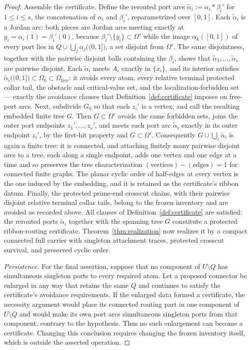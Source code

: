 \documentclass[11pt,reqno]{amsart}
\theoremstyle{definition}
\theoremstyle{remark}
\newcommand{\Omfree}{\Omega_{\mathrm{free}}}
\begin{document}
\begin{proof}
Assemble the certificate. Define the rerouted port arcs
$\tilde\alpha_i:=\alpha_i*\beta_i'$ for $1\le i\le s$, the concatenation of $\alpha_i$
and $\beta_i'$, reparametrized over $[0,1]$. Each $\tilde\alpha_i$ is a Jordan arc: both
pieces are Jordan arcs meeting exactly at $y_i=\alpha_i(1)=\beta_i'(0)$, because
$\beta_i'\setminus\{y_i\}\subset\Omega'$ while the image
$\alpha_k([0,1])$ of every port lies in
$Q\cup\bigcup_j\alpha_j\bigl((0,1]\bigr)$, a set disjoint from $\Omega'$. The same
disjointness, together with the pairwise disjoint balls containing the $\beta_i$, shows
that $\tilde\alpha_1,\dots,\tilde\alpha_s$ are pairwise disjoint. Each $\tilde\alpha_i$
meets $A_i$ exactly in $\{x_i\}$, and its interior satisfies
$\tilde\alpha_i\bigl((0,1]\bigr)\subset\Omega_0\subset\Omfree$: it avoids every atom,
every relative terminal protected collar tail, the obstacle and critical-value set, and the
localization-forbidden set --- exactly the avoidance clauses that
Definition~\ref{def:certificate} imposes on free-port arcs. Next, subdivide $G_0$ so
that each $z_i'$ is a vertex, and call the resulting embedded finite tree $G$. Then
$G\subset\Omega'$ avoids the same forbidden sets, joins the outer port endpoints
$z_1',\dots,z_s'$, and meets each port arc $\tilde\alpha_i$ exactly in its outer
endpoint $z_i'$, by the first-hit property and $G\subset\Omega'$. Consequently
$G\cup\bigcup_i\tilde\alpha_i$ is again a finite tree: it is connected, and attaching
finitely many pairwise disjoint arcs to a tree, each along a single endpoint, adds one
vertex and one edge at a time and so preserves the tree characterization
$(\text{vertices})-(\text{edges})=1$ for connected finite graphs. The planar cyclic
order of half-edges at every vertex is the one induced by the embedding, and it is
retained as the certificate's ribbon datum. Finally, the protected prime-end crosscut
chains, with their pairwise disjoint relative terminal collar tails, belong to the frozen
inventory and are avoided as recorded above. All clauses of
Definition~\ref{def:certificate} are satisfied: the rerouted ports $\tilde\alpha_i$
together with the spanning tree $G$ constitute a protected ribbon-routing certificate.
Theorem~\ref{thm:realization} now realizes it by a compact connected full carrier with
singleton attachment traces, protected crosscut survival, and preserved cyclic order.

\emph{Persistence.}
For the final assertion, suppose that no component of $U\setminus Q$ has
simultaneous singleton ports to every required atom.  Let a proposed
connector be enlarged in any way that retains the same $Q$ and continues
to satisfy the certificate's avoidance requirements.  If the enlarged
data formed a certificate, the necessity argument would place its connected
routing part in one component of $U\setminus Q$ and would make its own port
arcs simultaneous singleton ports from that component, contrary to the
hypothesis.  Thus no such enlargement can become a certificate.  Changing
this conclusion requires changing the frozen inventory itself, which is
outside the asserted operation.
\end{proof}
\end{document}
